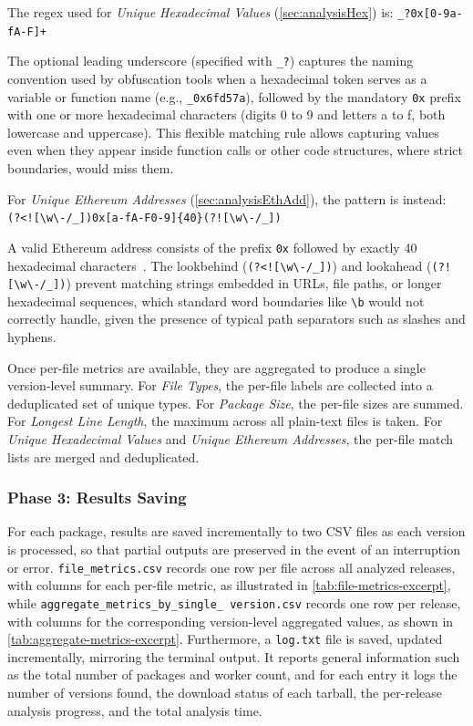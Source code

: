 The regex used for \emph{Unique Hexadecimal Values} (\cref{sec:analysisHex}) is: \verb|_?0x[0-9a-fA-F]+|

The optional leading underscore (specified with \texttt{\_?}) captures the naming convention used by obfuscation
tools when a hexadecimal token serves as a variable or function name (e.g., \texttt{\_0x6fd57a}), 
followed by the mandatory \texttt{0x} prefix with one or more hexadecimal characters (digits 0 to 9 and letters a to f, both lowercase and uppercase).
This flexible matching rule allows capturing values even when they appear inside function calls or other code structures, 
where strict boundaries, would miss them.

For \emph{Unique Ethereum Addresses} (\cref{sec:analysisEthAdd}), the pattern is instead: \\
\verb|(?<![\w\-/_])0x[a-fA-F0-9]{40}(?![\w\-/_])|

A valid Ethereum address consists of the prefix \texttt{0x} followed by exactly 40 hexadecimal characters~\cite{ethereum}.
The lookbehind (\texttt{(?<![{\textbackslash}w{\textbackslash}-/\_])}) 
and lookahead (\texttt{(?![{\textbackslash}w{\textbackslash}-/\_])})
prevent matching strings embedded in URLs, file paths, or longer hexadecimal sequences, 
which standard word boundaries like \texttt{{\textbackslash}b} would not correctly handle, 
given the presence of typical path separators such as slashes and hyphens.

Once per-file metrics are available, they are aggregated to produce a single version-level summary. 
For \emph{File Types}, the per-file labels are collected into a deduplicated set of unique types. 
For \emph{Package Size}, the per-file sizes are summed. 
For \emph{Longest Line Length}, the maximum across all plain-text files is taken. 
For \emph{Unique Hexadecimal Values} and \emph{Unique Ethereum Addresses}, the per-file match lists are merged and deduplicated.

\subsubsection{Phase 3: Results Saving}
\label{subsubsec:ToolForAnalyzingPkgsPhase3}

For each package, results are saved incrementally to two CSV files as each version is processed, 
so that partial outputs are preserved in the event of an interruption or error.
\texttt{file\_metrics.csv} records one row per file across all analyzed releases, 
with columns for each per-file metric, as illustrated in \cref{tab:file-metrics-excerpt},
while \texttt{aggregate\_metrics\_by\_single\_ \allowbreak version.csv} records one row per release, 
with columns for the corresponding version-level aggregated values, as shown in \cref{tab:aggregate-metrics-excerpt}.
Furthermore, a \texttt{log.txt} file is saved, updated incrementally, mirroring the terminal output.
It reports general information such as the total number of packages and worker count, 
and for each entry it logs the number of versions found, 
the download status of each tarball, the per-release analysis progress, and the total analysis time.

